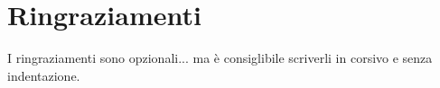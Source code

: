 \chapter*{Ringraziamenti}

\begin{itshape}
\setlength\parindent{0pt}

I ringraziamenti sono opzionali... ma è consiglibile scriverli in corsivo e senza indentazione.


\lipsum[1]

\end{itshape}
